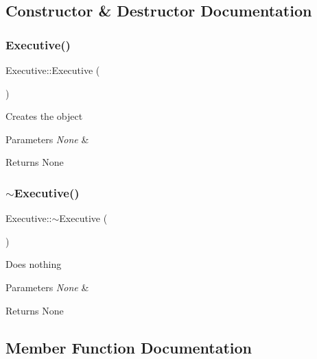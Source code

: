 \subsection{Constructor \& Destructor Documentation}
\mbox{\label{class_executive_ad870c1d741f1f313eb0c5a8336f8af6b}} 
\subsubsection{\texorpdfstring{Executive()}{Executive()}}
{\footnotesize\ttfamily Executive\+::\+Executive (\begin{DoxyParamCaption}{ }\end{DoxyParamCaption})}

Creates the object 
\begin{DoxyParams}{Parameters}
{\em None} & \\
\hline
\end{DoxyParams}
\begin{DoxyReturn}{Returns}
None 
\end{DoxyReturn}
\mbox{\label{class_executive_a4ce80c499f7640b1770ade77cf56d965}} 
\subsubsection{\texorpdfstring{$\sim$\+Executive()}{~Executive()}}
{\footnotesize\ttfamily Executive\+::$\sim$\+Executive (\begin{DoxyParamCaption}{ }\end{DoxyParamCaption})}

Does nothing 
\begin{DoxyParams}{Parameters}
{\em None} & \\
\hline
\end{DoxyParams}
\begin{DoxyReturn}{Returns}
None 
\end{DoxyReturn}


\subsection{Member Function Documentation}
\mbox{\label{class_executive_aa6ef4869740ffb4ad00da8e03524b757}} 
